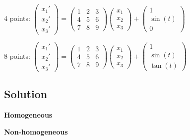 4 points:
$\displaystyle
\left(
    \begin{array}{c}
        x_1' \\
        x_2' \\
        x_3'
    \end{array}
\right)
=
\left(
    \begin{array}{ccc}
        1 & 2 & 3 \\
        4 & 5 & 6 \\
        7 & 8 & 9
    \end{array}
\right)
\left(
    \begin{array}{c}
        x_1 \\
        x_2 \\
        x_3
    \end{array}
\right)
+
\left(
    \begin{array}{c}
        1 \\
        \sin(t) \\
        0
    \end{array}
\right)$

8 points:
$\displaystyle
\left(
    \begin{array}{c}
        x_1' \\
        x_2' \\
        x_3'
    \end{array}
\right)
=
\left(
    \begin{array}{ccc}
        1 & 2 & 3 \\
        4 & 5 & 6 \\
        7 & 8 & 9
    \end{array}
\right)
\left(
    \begin{array}{c}
        x_1 \\
        x_2 \\
        x_3
    \end{array}
\right)
+
\left(
    \begin{array}{c}
        1 \\
        \sin(t) \\
        \tan(t)
    \end{array}
\right)$

\subsection*{Solution}
\textbf{Homogeneous}\\

\textbf{Non-homogeneous}\\




